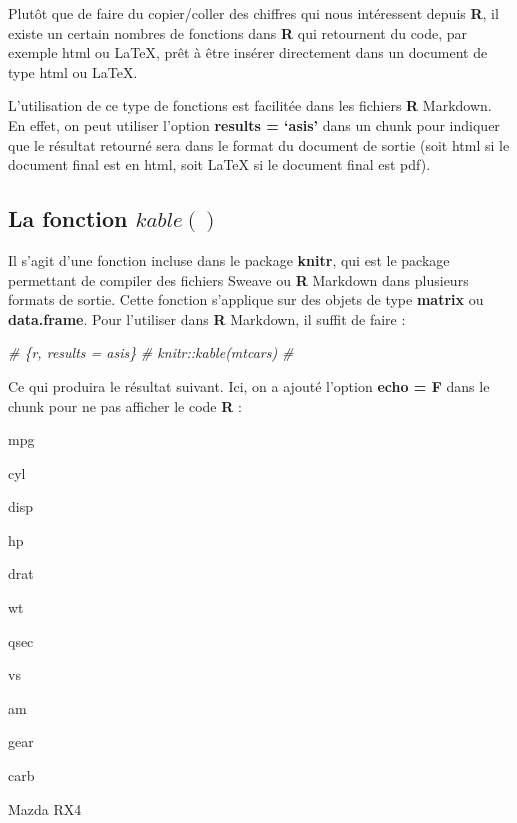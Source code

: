 \documentclass[
]{book}
\newenvironment{Shaded}{\begin{snugshade}}{\end{snugshade}}
\newcommand{\CommentTok}[1]{\textcolor[rgb]{0.56,0.35,0.01}{\textit{#1}}}
\theoremstyle{definition}
\theoremstyle{definition}
\theoremstyle{definition}
\theoremstyle{definition}
\theoremstyle{remark}
\begin{document}
Plutôt que de faire du copier/coller des chiffres qui nous intéressent depuis \textbf{R}, il existe un certain nombres de fonctions dans \textbf{R} qui retournent du code, par exemple html ou LaTeX, prêt à être insérer directement dans un document de type html ou LaTeX.

L'utilisation de ce type de fonctions est facilitée dans les fichiers \textbf{R} Markdown. En effet, on peut utiliser l'option \textbf{results = `asis'} dans un chunk pour indiquer que le résultat retourné sera dans le format du document de sortie (soit html si le document final est en html, soit LaTeX si le document final est pdf).

\hypertarget{la-fonction-kable}{%
\subsection{\texorpdfstring{La fonction \(kable()\)}{La fonction kable()}}\label{la-fonction-kable}}

Il s'agit d'une fonction incluse dans le package \textbf{knitr}, qui est le package permettant de compiler des fichiers Sweave ou \textbf{R} Markdown dans plusieurs formats de sortie. Cette fonction s'applique sur des objets de type \textbf{matrix} ou \textbf{data.frame}. Pour l'utiliser dans \textbf{R} Markdown, il suffit de faire :

\begin{Shaded}
\begin{Highlighting}[]
\CommentTok{\# \textasciigrave{}\textasciigrave{}\textasciigrave{}\{r, results = \textquotesingle{}asis\textquotesingle{}\}}
\CommentTok{\# knitr::kable(mtcars)}
\CommentTok{\# \textasciigrave{}\textasciigrave{}\textasciigrave{}}
\end{Highlighting}
\end{Shaded}

Ce qui produira le résultat suivant. Ici, on a ajouté l'option \textbf{echo = F} dans le chunk pour ne pas afficher le code \textbf{R} :

mpg

cyl

disp

hp

drat

wt

qsec

vs

am

gear

carb

Mazda RX4
\end{document}
